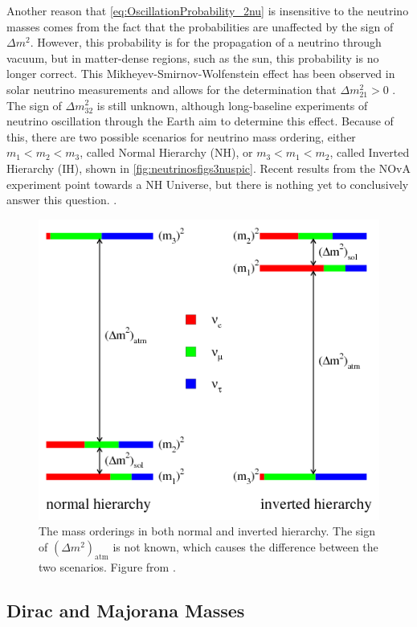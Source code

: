 Another reason that \autoref{eq:OscillationProbability_2nu} is insensitive to the neutrino masses comes from the fact that the probabilities are unaffected by the sign of $\Delta m^2$.
However, this probability is for the propagation of a neutrino through vacuum, but in matter-dense regions, such as the sun, this probability is no longer correct.
This Mikheyev-Smirnov-Wolfenstein effect has been observed in solar neutrino measurements and allows for the determination that $\Delta m_{21}^2>0$ \cite{1367-2630-6-1-139, PhysRevD.17.2369}.
The sign of $\Delta m_{32}^2$ is still unknown, although long-baseline experiments of neutrino oscillation through the Earth aim to determine this effect.
Because of this, there are two possible scenarios for neutrino mass ordering, either $m_1 < m_2 < m_3$, called Normal Hierarchy (NH), or $m_3 < m_1 < m_2$, called Inverted Hierarchy (IH), shown in \autoref{fig:neutrinosfigs3nuspic}.
Recent results from the NOvA experiment point towards a NH Universe, but there is nothing yet to conclusively answer this question. \cite{Adamson:2017gxd}.
\begin{figure}[tbph]
\centering
\includegraphics[width=0.8\linewidth]{Figures/Neutrinos_figs_3nuspic.png}
\caption[The mass orderings in both normal and inverted hierarchy]
{The mass orderings in both normal and inverted hierarchy.
The sign of $(\Delta m^2)_{\textrm{atm}}$ is not known, which causes the difference between the two scenarios.
Figure from \cite{Hewett:2012ns}.}
\label{fig:neutrinosfigs3nuspic}
\end{figure}

\subsection{Dirac and Majorana Masses}
\label{ssec:Dirac and Majorana Masses}

